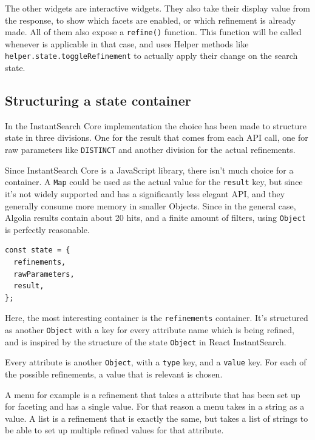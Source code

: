 The other widgets are interactive widgets. They also take their display value from the response, to show which facets are enabled, or which refinement is already made. All of them also expose a {\tt refine()} function. This function will be called whenever is applicable in that case, and uses Helper methods like {\tt helper.state.toggleRefinement} to actually apply their change on the search state.


\subsection{Structuring a state container}
\label{sub:structuring_a_state_container}

In the InstantSearch Core implementation the choice has been made to structure state in three divisions. One for the result that comes from each API call, one for raw parameters like {\tt DISTINCT} and another division for the actual refinements.

Since InstantSearch Core is a JavaScript library, there isn't much choice for a container. A {\tt Map}\cite{mdn-map} could be used as the actual value for the {\tt result} key, but since it's not widely supported and has a significantly less elegant API, and they generally consume more memory in smaller Objects. Since in the general case, Algolia results contain about 20 hits, and a finite amount of filters, using {\tt Object} is perfectly reasonable.

\begin{minipage}{\linewidth}
\begin{lstlisting}[caption={The state container of InstantSearch Core},label={lst:is-core-state-1}]
const state = {
  refinements,
  rawParameters,
  result,
};
\end{lstlisting}
\end{minipage}

Here, the most interesting container is the {\tt refinements} container. It's structured as another {\tt Object} with a key for every attribute name which is being refined, and is inspired by the structure of the state {\tt Object} in React InstantSearch\cite{react-instantsearch-search-state}.

Every attribute is another {\tt Object}, with a {\tt type} key, and a {\tt value} key. For each of the possible refinements, a value that is relevant is chosen. 

A menu for example is a refinement that takes a attribute that has been set up for faceting\cite{algolia-set-up-faceting} and has a single value. For that reason a menu takes in a string as a value. A list is a refinement that is exactly the same, but takes a list of strings to be able to set up multiple refined values for that attribute.

